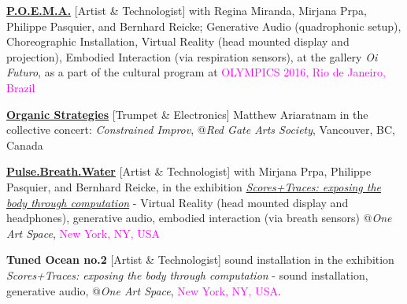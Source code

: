 \documentclass[10pt,letterpaper]{moderncv} %
\begin{document}
	 {\textbf{\href{https://kivanctatar.com/POEMA}{P.O.E.M.A.}} [Artist \& Technologist] with Regina Miranda, Mirjana Prpa, Philippe Pasquier, and Bernhard Reicke; Generative Audio (quadrophonic setup), Choreographic Installation, Virtual Reality (head mounted display and projection), Embodied Interaction (via respiration sensors), at the gallery \textit{Oi Futuro}, as a part of the cultural program at \textcolor{magenta}{OLYMPICS 2016, Rio de Janeiro, Brazil}}
	
	
	 {\href{https://kivanctatar.com/Organic-Strategies}{\textbf{Organic Strategies}} [Trumpet \& Electronics] Matthew Ariaratnam in the collective concert: \textit{Constrained Improv}, @\textit{Red Gate Arts Society}, Vancouver, BC, Canada}
	
	 {\href{https://kivanctatar.com/Pulse-Breath-Water}{\textbf{Pulse.Breath.Water}} [Artist \& Technologist] with Mirjana Prpa, Philippe Pasquier, and Bernhard Reicke, in the exhibition \href{http://oneartspace.com/2016/03/10/scorestraces-exposing-the-body-through-computation/}{\textit{Scores+Traces: exposing the body through computation}} - Virtual Reality (head mounted display and headphones), generative audio, embodied interaction (via breath sensors) @\textit{One Art Space}, \textcolor{magenta}{New York, NY, USA}}
	
	 {\textbf{Tuned Ocean no.2} [Artist \& Technologist] sound installation in the exhibition \textit{Scores+Traces: exposing the body through computation}  - sound installation, generative audio, @\textit{One Art Space}, \textcolor{magenta}{New York, NY, USA}.}
	
	
	
\end{document}
